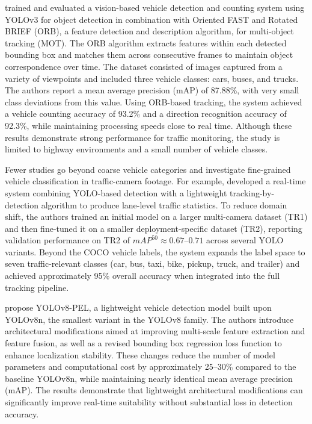 \cite{Song2019VisionBasedVehicle} trained and evaluated a vision-based vehicle detection and counting system using YOLOv3 for object detection in combination with Oriented FAST and Rotated BRIEF (ORB), a feature detection and description algorithm, for multi-object tracking (MOT). The ORB algorithm extracts features within each detected bounding box and matches them across consecutive frames to maintain object correspondence over time. The dataset consisted of images captured from a variety of viewpoints and included three vehicle classes: cars, buses, and trucks. The authors report a mean average precision (mAP) of 87.88\%, with very small class deviations from this value. Using ORB-based tracking, the system achieved a vehicle counting accuracy of 93.2\% and a direction recognition accuracy of 92.3\%, while maintaining processing speeds close to real time. Although these results demonstrate strong performance for traffic monitoring, the study is limited to highway environments and a small number of vehicle classes.

Fewer studies go beyond coarse vehicle categories and investigate fine-grained vehicle classification in traffic-camera footage. For example, \cite{Neupane2022RealTimeVehicle} developed a real-time system combining YOLO-based detection with a lightweight tracking-by-detection algorithm to produce lane-level traffic statistics. To reduce domain shift, the authors trained an initial model on a larger multi-camera dataset (TR1) and then fine-tuned it on a smaller deployment-specific dataset (TR2), reporting validation performance on TR2 of $mAP^{50}\approx0.67$--$0.71$ across several YOLO variants. Beyond the COCO vehicle labels, the system expands the label space to seven traffic-relevant classes (car, bus, taxi, bike, pickup, truck, and trailer) and achieved approximately 95\% overall accuracy when integrated into the full tracking pipeline.

\cite{YOLO-PEL} propose YOLOv8-PEL, a lightweight vehicle detection model built upon YOLOv8n, the smallest variant in the YOLOv8 family. The authors introduce architectural modifications aimed at improving multi-scale feature extraction and feature fusion, as well as a revised bounding box regression loss function to enhance localization stability. These changes reduce the number of model parameters and computational cost by approximately 25–30\% compared to the baseline YOLOv8n, while maintaining nearly identical mean average precision (mAP). The results demonstrate that lightweight architectural modifications can significantly improve real-time suitability without substantial loss in detection accuracy.

